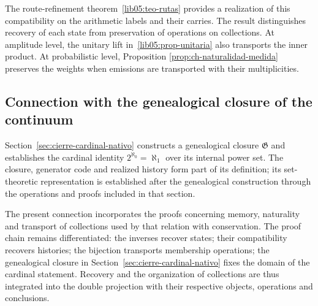 The route-refinement theorem~\ref{lib05:teo-rutas}
provides a realization of this compatibility on the arithmetic
labels and their carries. The result distinguishes recovery
of each state from preservation of operations on collections.
At amplitude level, the unitary lift
in~\ref{lib05:prop-unitaria} also transports the inner product.
At probabilistic level, Proposition
\ref{prop:ch-naturalidad-medida} preserves the weights when
emissions are transported with their multiplicities.

\subsection{Connection with the genealogical closure of the continuum}
Section~\ref{sec:cierre-cardinal-nativo} constructs a genealogical
closure \(\mathfrak G\) and establishes the cardinal identity
\(2^{\aleph_0}=\aleph_1\) over its internal power set. The closure,
generator code and realized history form part of its
definition; its set-theoretic representation is established after the
genealogical construction through the operations and proofs
included in that section.

The present connection incorporates the proofs concerning memory,
naturality and transport of collections used by that relation with
conservation. The proof chain remains differentiated:
the inverses recover states; their compatibility recovers
histories; the bijection transports membership operations;
the genealogical closure in Section~\ref{sec:cierre-cardinal-nativo} fixes the domain
of the cardinal statement. Recovery and the organization
of collections are thus integrated into the double projection with their respective
objects, operations and conclusions.
